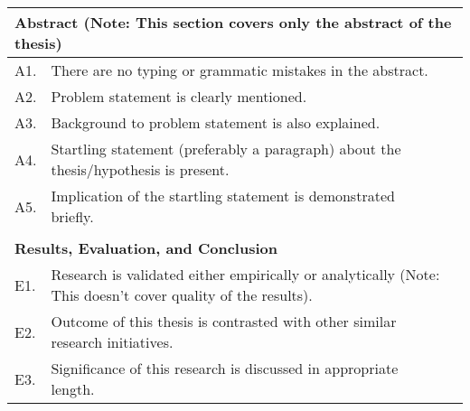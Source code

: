 \begin{table}[!ht]
\begin{adjustbox}{width=\linewidth,center}
\begin{tabular}{p{0.6cm}p{9cm}p{0.6cm}}
\multicolumn{3}{|l|}{\textbf{Abstract (Note:   This section covers only the abstract of the thesis)}}                                                                                    \\ \midrule
\multicolumn{1}{|l|}{A1.} & \multicolumn{1}{l|}{There are no typing or grammatic   mistakes in the abstract.}                                                    & \multicolumn{1}{l|}{} \\ \midrule
\multicolumn{1}{|l|}{A2.} & \multicolumn{1}{l|}{Problem statement is   clearly mentioned.}                                                                       & \multicolumn{1}{l|}{} \\ \midrule
\multicolumn{1}{|l|}{A3.} & \multicolumn{1}{l|}{Background to problem   statement is also explained.}                                                            & \multicolumn{1}{l|}{} \\ \midrule
\multicolumn{1}{|l|}{A4.} & \multicolumn{1}{l|}{Startling statement   (preferably a paragraph) about the thesis/hypothesis is present.}                          & \multicolumn{1}{l|}{} \\ \midrule
\multicolumn{1}{|l|}{A5.} & \multicolumn{1}{l|}{Implication of the   startling statement is demonstrated briefly.}                                               & \multicolumn{1}{l|}{} \\ \midrule
                          &                                                                                                                                      &                       \\ \midrule
\multicolumn{3}{|l|}{\textbf{Results, Evaluation, and Conclusion}}                                                                                                                       \\ \midrule
\multicolumn{1}{|l|}{E1.} & \multicolumn{1}{l|}{Research is   validated either empirically or analytically (Note: This doesn’t cover   quality of the results).} & \multicolumn{1}{l|}{} \\ \midrule
\multicolumn{1}{|l|}{E2.} & \multicolumn{1}{l|}{Outcome of this   thesis is contrasted with other similar research initiatives.}                                 & \multicolumn{1}{l|}{} \\ \midrule
\multicolumn{1}{|l|}{E3.} & \multicolumn{1}{l|}{Significance of this   research is discussed in appropriate length.} \\ \midrule
\end{tabular}
\end{adjustbox}
\end{table}